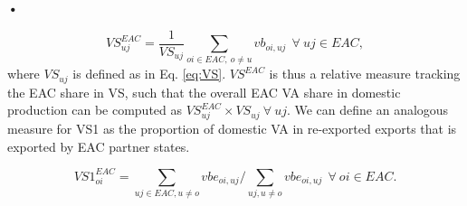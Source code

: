 \textbf{\textbf{•}}\documentclass[a4paper]{article}
\begin{document}
\begin{equation} \label{eq:VS_EAC}
VS_{uj}^{EAC} = \frac{1}{VS_{uj}}  \sum_{oi \in EAC,\ o \neq  u} vb_{oi, uj}   \ \ \forall\ uj \in EAC,
\end{equation}
where $VS_{uj}$ is defined as in Eq. \ref{eq:VS}. $VS^{EAC}$ is thus a relative measure tracking the EAC share in VS, such that the overall EAC VA share in domestic production can be computed as $VS_{uj}^{EAC} \times VS_{uj} \ \forall\ uj$. We can define an analogous measure for VS1 as the proportion of domestic VA in re-exported exports that is exported by EAC partner states. 

\begin{equation} \label{eq:VS1_EAC}
VS1_{oi}^{EAC} =  \sum_{uj \in EAC, u \neq  o} vbe_{oi, uj} \bigg/ \sum_{uj, u \neq  o} vbe_{oi, uj}\ \ \forall\ oi \in EAC.
\end{equation}
\end{document}
